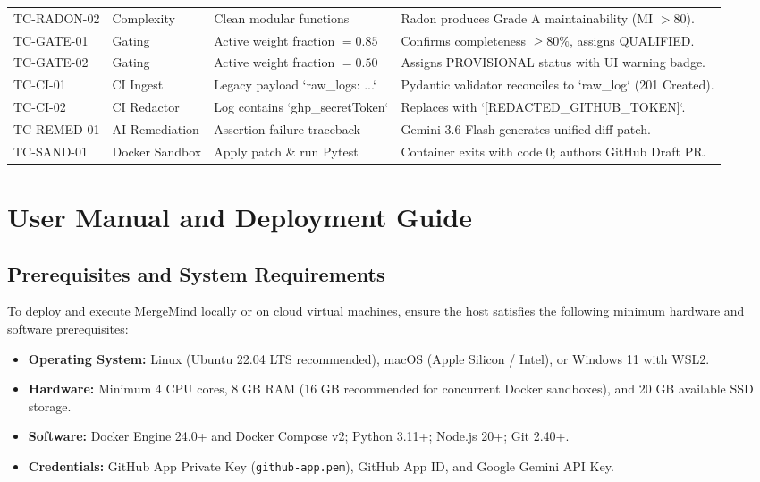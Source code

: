 \documentclass[12pt,a4paper,oneside]{report}
\begin{document}
\begin{longtable}{p{} p{} p{} p{}}
\addlinespace
TC-RADON-02 & Complexity & Clean modular functions & Radon produces Grade A maintainability (MI $>80$). \\
\addlinespace
TC-GATE-01 & Gating & Active weight fraction $=0.85$ & Confirms completeness $\ge 80\%$, assigns QUALIFIED. \\
\addlinespace
TC-GATE-02 & Gating & Active weight fraction $=0.50$ & Assigns PROVISIONAL status with UI warning badge. \\
\addlinespace
TC-CI-01 & CI Ingest & Legacy payload `{raw\_logs: ...}` & Pydantic validator reconciles to `raw\_log` (201 Created). \\
\addlinespace
TC-CI-02 & CI Redactor & Log contains `ghp\_secretToken` & Replaces with `[REDACTED\_GITHUB\_TOKEN]`. \\
\addlinespace
TC-REMED-01 & AI Remediation & Assertion failure traceback & Gemini 3.6 Flash generates unified diff patch. \\
\addlinespace
TC-SAND-01 & Docker Sandbox & Apply patch \& run Pytest & Container exits with code 0; authors GitHub Draft PR. \\
\end{longtable}

\cleardoublepage

\chapter{User Manual and Deployment Guide}
\label{app:user-manual}

\section{Prerequisites and System Requirements}

To deploy and execute MergeMind locally or on cloud virtual machines, ensure the host satisfies the following minimum hardware and software prerequisites:

\begin{itemize}
    \item \textbf{Operating System:} Linux (Ubuntu 22.04 LTS recommended), macOS (Apple Silicon / Intel), or Windows 11 with WSL2.
    \item \textbf{Hardware:} Minimum 4 CPU cores, 8 GB RAM (16 GB recommended for concurrent Docker sandboxes), and 20 GB available SSD storage.
    \item \textbf{Software:} Docker Engine 24.0+ and Docker Compose v2; Python 3.11+; Node.js 20+; Git 2.40+.
    \item \textbf{Credentials:} GitHub App Private Key (\texttt{github-app.pem}), GitHub App ID, and Google Gemini API Key.
\end{itemize}
\end{document}
